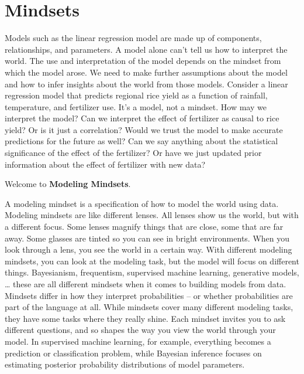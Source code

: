 \documentclass[
  10pt,
]{scrbook}
\begin{document}
\hypertarget{mindsets}{%
\chapter{Mindsets}\label{mindsets}}

Models such as the linear regression model are made up of components, relationships, and parameters.
A model alone can't tell us how to interpret the world.
The use and interpretation of the model depends on the mindset from which the model arose.
We need to make further assumptions about the model and how to infer insights about the world from those models.
Consider a linear regression model that predicts regional rice yield as a function of rainfall, temperature, and fertilizer use.
It's a model, not a mindset.
How may we interpret the model?
Can we interpret the effect of fertilizer as causal to rice yield? Or is it just a correlation?
Would we trust the model to make accurate predictions for the future as well?
Can we say anything about the statistical significance of the effect of the fertilizer?
Or have we just updated prior information about the effect of fertilizer with new data?

Welcome to \textbf{Modeling Mindsets}.

A modeling mindset is a specification of how to model the world using data.
Modeling mindsets are like different lenses.
All lenses show us the world, but with a different focus.
Some lenses magnify things that are close, some that are far away.
Some glasses are tinted so you can see in bright environments.
When you look through a lens, you see the world in a certain way.
With different modeling mindsets, you can look at the modeling task, but the model will focus on different things.
Bayesianism, frequentism, supervised machine learning, generative models, \ldots{} these are all different mindsets when it comes to building models from data.
Mindsets differ in how they interpret probabilities -- or whether probabilities are part of the language at all.
While mindsets cover many different modeling tasks, they have some tasks where they really shine.
Each mindset invites you to ask different questions, and so shapes the way you view the world through your model.
In supervised machine learning, for example, everything becomes a prediction or classification problem, while Bayesian inference focuses on estimating posterior probability distributions of model parameters.
\end{document}
